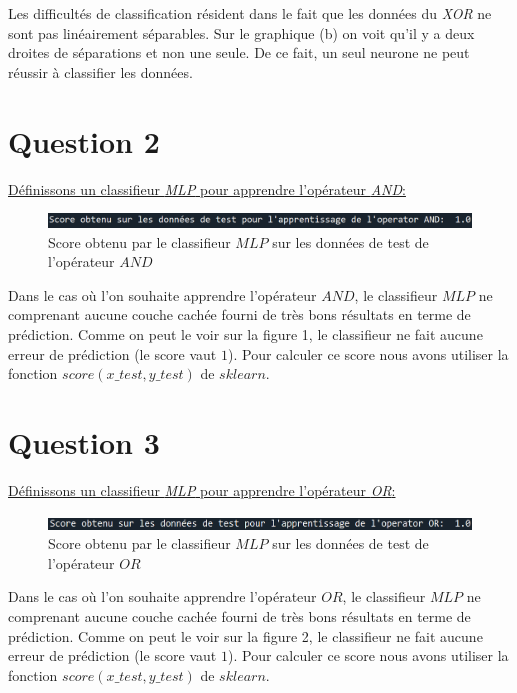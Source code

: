 \documentclass[frenchb]{report}
\newcommand{\1}{\mathbbm{1}}
\theoremstyle{definition}\newtheorem{defn}{Définition}
\theoremstyle{definition}\newtheorem{exm}{Exemple}
\theoremstyle{definition}\newtheorem{nota}{Notation}
\theoremstyle{definition}\newtheorem{rem}{Remarque}
\begin{document}
Les difficultés de classification résident dans le fait que les données du \textit{XOR} ne sont pas linéairement séparables. Sur le graphique (b) on voit qu'il y a deux droites de séparations et non une seule. De ce fait, un seul neurone ne peut réussir à classifier les données.

\section*{Question 2}


\underline{Définissons un classifieur \textit{MLP} pour apprendre l’opérateur \textit{AND}:}

\begin{figure}[H]
	\centering
	\includegraphics[scale=0.7]{images/Q2.png}
	\caption{Score obtenu par le classifieur $MLP$ sur les données de test de l'opérateur $AND$}
\end{figure}
Dans le cas où l'on souhaite apprendre l'opérateur $AND$, le classifieur $MLP$ ne comprenant aucune couche cachée fourni de très bons résultats en terme de prédiction. Comme on peut le voir sur la figure 1, le classifieur ne fait aucune erreur de prédiction (le score vaut $1$). Pour calculer ce score nous avons utiliser la fonction $score(x\_test, y\_test)$ de $sklearn$.
\section*{Question 3}


\underline{Définissons un classifieur \textit{MLP} pour apprendre l’opérateur \textit{OR}:}

\begin{figure}[H]
	\centering
	\includegraphics[scale=0.7]{images/Q3.png}
	\caption{Score obtenu par le classifieur $MLP$ sur les données de test de l'opérateur $OR$}
\end{figure}
Dans le cas où l'on souhaite apprendre l'opérateur $OR$, le classifieur $MLP$ ne comprenant aucune couche cachée fourni de très bons résultats en terme de prédiction. Comme on peut le voir sur la figure 2, le classifieur ne fait aucune erreur de prédiction (le score vaut $1$). Pour calculer ce score nous avons utiliser la fonction $score(x\_test, y\_test)$ de $sklearn$.
\end{document}
